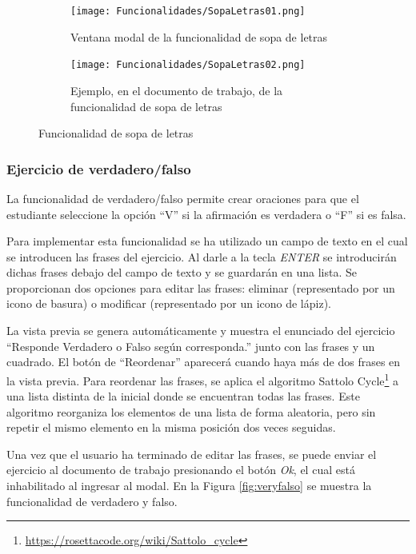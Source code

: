 \begin{figure}[ht!]
  \centering
  \begin{subfigure}{\textwidth}
    \centering
    \texttt{[image: Funcionalidades/SopaLetras01.png]}
    \caption{Ventana modal de la funcionalidad de sopa de letras}
    \label{fig:impsopaletras01}
  \end{subfigure}

  \begin{subfigure}{\textwidth}
    \centering
    \texttt{[image: Funcionalidades/SopaLetras02.png]}
    \caption{Ejemplo, en el documento de trabajo, de la funcionalidad de sopa de letras}
    \label{fig:impsopaletras02}
  \end{subfigure}

  \caption{Funcionalidad de sopa de letras}
  \label{fig:impsopaletras}
\end{figure}

\subsubsection{Ejercicio de verdadero/falso}
\label{sec:funcioVF}
La funcionalidad de verdadero/falso permite crear oraciones para que el estudiante seleccione la opción ``V'' si la afirmación es verdadera o ``F'' si es falsa.

Para implementar esta funcionalidad se ha utilizado un campo de texto en el cual se introducen las frases del ejercicio. Al darle a la tecla \textit{ENTER} se introducirán dichas frases debajo del campo de texto y se guardarán en una lista. Se proporcionan dos opciones para editar las frases: eliminar (representado por un icono de basura) o modificar (representado por un icono de lápiz).

La vista previa se genera automáticamente y muestra el enunciado del ejercicio ``Responde Verdadero o Falso según corresponda.'' junto con las frases y un cuadrado. El botón de ``Reordenar'' aparecerá cuando haya más de dos frases en la vista previa. Para reordenar las frases, se aplica el algoritmo Sattolo Cycle\footnote{\url{https://rosettacode.org/wiki/Sattolo_cycle}} a una lista distinta de la inicial donde se encuentran todas las frases. Este algoritmo reorganiza los elementos de una lista de forma aleatoria, pero sin repetir el mismo elemento en la misma posición dos veces seguidas.

Una vez que el usuario ha terminado de editar las frases, se puede enviar el ejercicio al documento de trabajo presionando el botón \textit{Ok}, el cual está inhabilitado al ingresar al modal. En la Figura \ref{fig:veryfalso} se muestra la funcionalidad de verdadero y falso.

